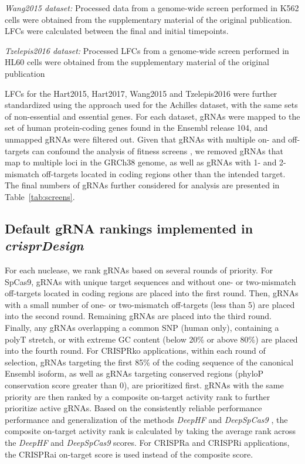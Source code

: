 \documentclass[pdftex,english,10pt]{article}
\begin{document}
{ \textit{Wang2015 dataset:} Processed data from a genome-wide screen performed in K562 cells \citep{sabatini} were obtained from the supplementary material of the original publication. LFCs were calculated between the final and initial timepoints. 

\textit{Tzelepis2016 dataset:} Processed LFCs from a genome-wide screen performed in HL60 cells \citep{yusa} were obtained from the supplementary material of the original publication

LFCs for the Hart2015, Hart2017, Wang2015 and Tzelepis2016 were further standardized using the approach used for the Achilles dataset, with the same sets of non-essential and essential genes. For each dataset, gRNAs were mapped to the set of human protein-coding genes found in the Ensembl release 104, and unmapped gRNAs were filtered out. Given that gRNAs with multiple on- and off-targets can confound the analysis of fitness screens \citep{fortin2019}, we removed gRNAs that map to multiple loci in the GRCh38 genome, as well as gRNAs with 1- and 2-mismatch off-targets located in coding regions other than the intended target. The final numbers of gRNAs further considered for analysis are presented in Table~\ref{tab:screens}.







\subsection*{Default gRNA rankings implemented in \textit{crisprDesign}}

For each nuclease, we rank gRNAs based on several rounds of priority. For SpCas9, gRNAs with unique target sequences and without one- or two-mismatch off-targets located in coding regions are placed into the first round. Then, gRNAs with a small number of one- or two-mismatch off-targets (less than 5) are placed into the second round. Remaining gRNAs are placed into the third round. Finally, any gRNAs overlapping a common SNP (human only), containing a polyT stretch, or with extreme GC content (below 20\% or above 80\%) are placed into the fourth round. For CRISPRko applications, within each round of selection, gRNAs targeting the first 85\% of the coding sequence of the canonical Ensembl isoform, as well as gRNAs targeting conserved regions (phyloP conservation score greater than 0), are prioritized first. gRNAs with the same priority are then ranked by a composite on-target activity rank to further prioritize active gRNAs. Based on the consistently reliable performance performance and generalization of the methods \textit{DeepHF} and \textit{DeepSpCas9} \citep{konstantakos2022crispr,deepcas9,deepspcas9}, 
the composite on-target activity rank is calculated by taking the average rank across the \textit{DeepHF} and \textit{DeepSpCas9} scores. For CRISPRa and CRISPRi applications, the CRISPRai on-target score is used instead of the composite score. 

}
\end{document}
